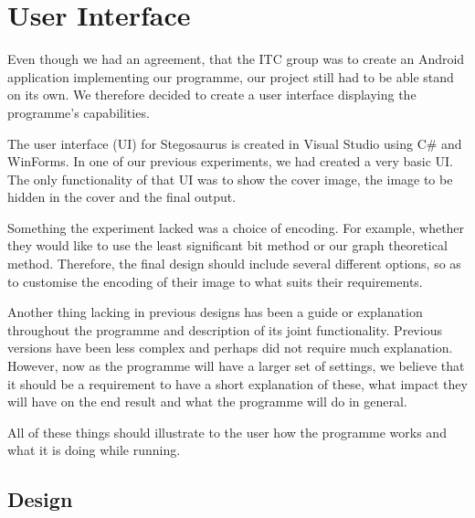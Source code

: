 \section{User Interface}
\label{sec:designUI}
Even though we had an agreement, that the ITC group was to create an Android application implementing our programme, our project still had to be able stand on its own. We therefore decided to create a user interface displaying the programme's capabilities. 

The user interface (UI) for Stegosaurus is created in Visual Studio using C\# and WinForms.
In one of our previous experiments, we had created a very basic UI.
The only functionality of that UI was to show the cover image, the image to be hidden in the cover and the final output.

Something the experiment lacked was a choice of encoding.
For example, whether they would like to use the least significant bit method or our graph theoretical method.
Therefore, the final design should include several different options, so as to customise the encoding of their image to what suits their requirements.

Another thing lacking in previous designs has been a guide or explanation throughout the programme and description of its joint functionality.
Previous versions have been less complex and perhaps did not require much explanation.
However, now as the programme will have a larger set of settings, we believe that it should be a requirement to have a short explanation of these, what impact they will have on the end result and what the programme will do in general.

All of these things should illustrate to the user how the programme works and what it is doing while running.

\subsection{Design}

